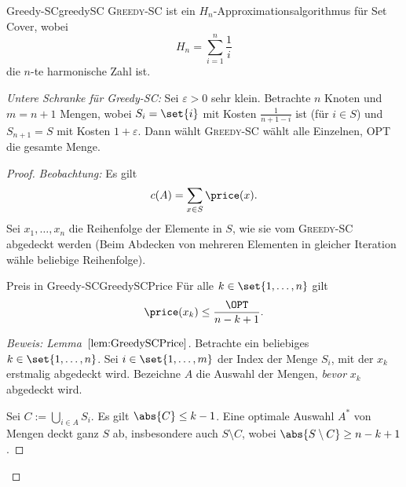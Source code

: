 \documentclass[language=ngerman,algolist]{TemplateLecture}
\begin{document}
\begin{thm}{Greedy-SC}{greedySC}
    \textsc{Greedy-SC} ist ein $H_n$-Approximationsalgorithmus für Set Cover, wobei
    \begin{equation*}
        H_n = \sum_{i = 1}^n \frac{1}{i}
    \end{equation*}
    die $n$-te harmonische Zahl ist.
\end{thm}

\emph{Untere Schranke für Greedy-SC:} Sei $\varepsilon > 0$ sehr klein. Betrachte $n$ Knoten und $m = n + 1$ Mengen, wobei $S_i = \set{i}$ mit Kosten $\frac{1}{n+1-i}$ ist (für $i \in S$) und $S_{n+1} = S$ mit Kosten $1 + \varepsilon$. Dann wählt \textsc{Greedy-SC} wählt alle Einzelnen, OPT die gesamte Menge.


\begin{proof}
    \emph{Beobachtung:} Es gilt 
    \begin{equation*}
        c(A) = \sum_{x \in S} \price(x).
    \end{equation*}
    Sei $x_1, \ldots, x_n$ die Reihenfolge der Elemente in $S$, wie sie vom \textsc{Greedy-SC} abgedeckt werden (Beim Abdecken von mehreren Elementen in gleicher Iteration wähle beliebige Reihenfolge).

    \begin{lem}{Preis in Greedy-SC}{GreedySCPrice}
        Für alle $k \in \set{1,\ldots,n}$ gilt
        \begin{equation*}
            \price(x_k) \leq \frac{\OPT}{n-k+1}.
        \end{equation*}
    \end{lem}
    \begin{proof}[Beweis: Lemma~$\ref{lem:GreedySCPrice}$]
        Betrachte ein beliebiges $k \in \set{1,\ldots,n}$. Sei $i \in \set{1,\ldots,m}$ der Index der Menge $S_i$, mit der $x_k$ erstmalig abgedeckt wird. Bezeichne $A$ die Auswahl der Mengen, \emph{bevor} $x_k$ abgedeckt wird.

        Sei $C := \bigcup_{i \in A} S_i$. Es gilt $\abs{C} \leq k - 1$. Eine optimale Auswahl $A^*$ von Mengen deckt ganz $S$ ab, insbesondere auch $S \setminus C$, wobei $\abs{S \setminus C} \geq n - k + 1$.


\end{proof}
\end{proof}
\end{document}
